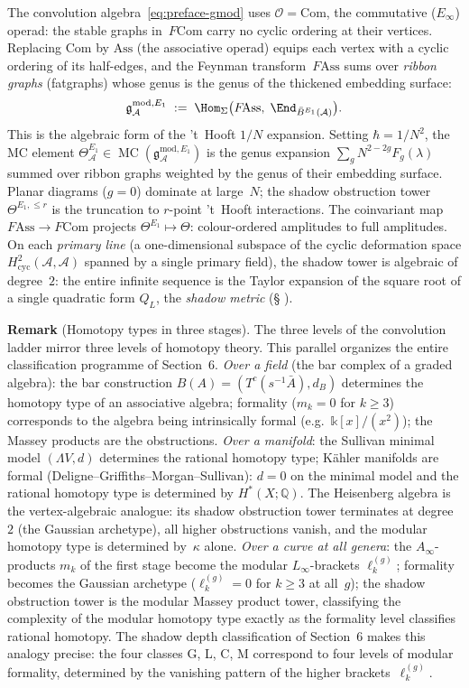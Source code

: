 \documentclass[11pt]{report}
\makeatletter
\theoremstyle{definition}
\theoremstyle{remark}
\providecommand{\cA}{\mathcal{A}}
\providecommand{\cO}{\mathcal{O}}
\providecommand{\barB}{\bar{B}}
\providecommand{\Eone}{E_1}
\providecommand{\Ass}{\mathrm{Ass}}
\providecommand{\Com}{\mathrm{Com}}
\providecommand{\Bbbk}{\mathbb{k}}
\numberwithin{equation}{section}
\let\svy@oldref\ref
\renewcommand{\ref}[1]{%
 \@ifundefined{r@#1}{\textit{full monograph}}{\svy@oldref{#1}}%
}
\makeatother
\begin{document}
The convolution algebra~\eqref{eq:preface-gmod} uses
$\cO=\Com$, the commutative ($E_\infty$) operad: the
stable graphs in~$F\Com$ carry no cyclic ordering at their
vertices. Replacing $\Com$ by $\Ass$ (the associative
operad) equips each vertex with a cyclic ordering of its
half-edges, and the Feynman transform~$F\!\Ass$ sums over
\emph{ribbon graphs} (fatgraphs) whose genus is the genus of
the thickened embedding surface:
\[
\mathfrak{g}^{\mathrm{mod},\Eone}_\cA
\;:=\;
\Hom_\Sigma\bigl(F\!\Ass,\;
\End_{\barB^{\Eone}(\cA)}\bigr).
\]
This is the algebraic form of the 't~Hooft $1/N$ expansion.
Setting $\hbar = 1/N^2$, the MC element
$\Theta^{\Eone}_\cA \in \operatorname{MC}(\mathfrak{g}^{\mathrm{mod},\Eone}_\cA)$
is the genus expansion
$\sum_g N^{2-2g}F_g(\lambda)$ summed over ribbon graphs weighted
by the genus of their embedding surface.
Planar diagrams ($g=0$) dominate at large~$N$; the shadow
obstruction tower $\Theta^{E_1,\le r}$ is the truncation to
$r$-point 't~Hooft interactions.
The coinvariant map $F\!\Ass \to F\Com$ projects
$\Theta^{E_1} \mapsto \Theta$:
colour-ordered amplitudes to full amplitudes.
On each \emph{primary line} (a one-dimensional subspace of the
cyclic deformation space $H^2_{\mathrm{cyc}}(\cA,\cA)$ spanned by
a single primary field), the shadow
tower is algebraic of degree~$2$:
the entire infinite sequence is the Taylor expansion of the square
root of a single quadratic form $Q_L$, the \emph{shadow metric}
(\S\ref{sec:shadow-metric}).

\medskip
\noindent\textbf{Remark} (Homotopy types in three stages).
The three levels of the convolution ladder mirror three levels of
homotopy theory. This parallel
organizes the entire classification programme of Section~6.
\emph{Over a field} (the bar complex of a graded algebra): the bar construction
$B(A) = (T^c(s^{-1}\bar A), d_B)$ determines the homotopy type of
an associative algebra; formality ($m_k=0$ for $k \ge 3$)
corresponds to the algebra being intrinsically formal (e.g.\
$\Bbbk[x]/(x^2)$); the Massey products are the obstructions.
\emph{Over a manifold}: the Sullivan minimal model
$(\Lambda V, d)$ determines the rational homotopy type; K\"ahler
manifolds are formal (Deligne--Griffiths--Morgan--Sullivan):
$d = 0$ on the minimal model and the rational homotopy type is
determined by $H^*(X;\mathbb Q)$. The Heisenberg algebra is the
vertex-algebraic analogue: its shadow obstruction tower terminates at
degree~$2$ (the Gaussian archetype), all higher obstructions
vanish, and the modular homotopy type is determined by~$\kappa$
alone. \emph{Over a curve at all genera}: the $A_\infty$-products
$m_k$ of the first stage become the modular $L_\infty$-brackets
$\ell_k^{(g)}$; formality becomes the Gaussian archetype
($\ell_k^{(g)}=0$ for $k \ge 3$ at all~$g$); the shadow
obstruction tower is the modular Massey product tower, classifying
the complexity of the modular homotopy type exactly as the
formality level classifies rational homotopy.
The shadow depth classification of Section~6 makes this analogy
precise: the four classes G, L, C, M correspond to four levels
of modular formality, determined by the vanishing pattern of the
higher brackets~$\ell_k^{(g)}$.
\end{document}
